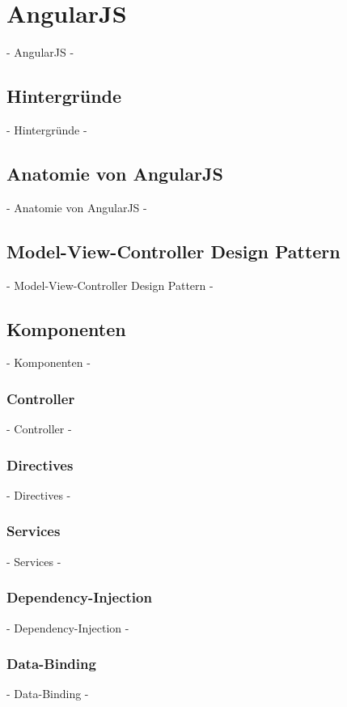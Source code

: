 {%

\newpage
\section{AngularJS}
 - AngularJS -

\subsection{Hintergründe}
 - Hintergründe -
\subsection{Anatomie von AngularJS}
 - Anatomie von AngularJS -
\subsection{Model-View-Controller Design Pattern}
 - Model-View-Controller Design Pattern -
\subsection{Komponenten}
 - Komponenten -

\subsubsection{Controller}
 - Controller -
\subsubsection{Directives}
 - Directives -
\subsubsection{Services}
 - Services -
\subsubsection{Dependency-Injection}
 - Dependency-Injection -
\subsubsection{Data-Binding}
 - Data-Binding -

}
